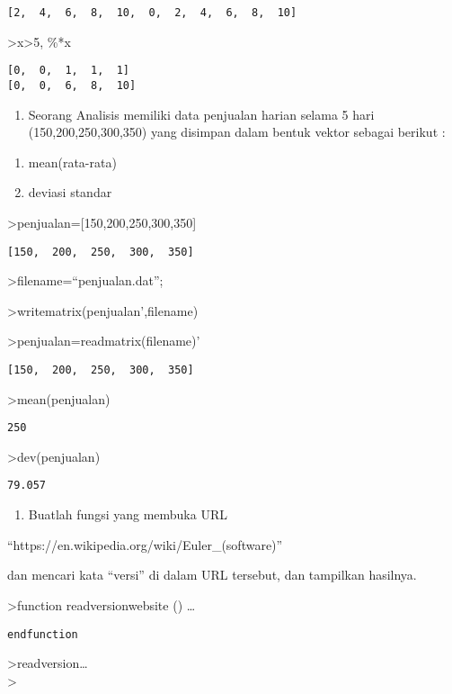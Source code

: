 \documentclass[
]{book}
\providecommand{\tightlist}{%
  \setlength{\itemsep}{0pt}\setlength{\parskip}{0pt}}
\begin{document}
\begin{verbatim}
[2,  4,  6,  8,  10,  0,  2,  4,  6,  8,  10]
\end{verbatim}

\textgreater x\textgreater5, \%*x

\begin{verbatim}
[0,  0,  1,  1,  1]
[0,  0,  6,  8,  10]
\end{verbatim}

\begin{enumerate}
\def\labelenumi{\arabic{enumi}.}
\setcounter{enumi}{1}
\tightlist
\item
  Seorang Analisis memiliki data penjualan harian selama 5 hari (150,200,250,300,350) yang disimpan dalam bentuk vektor sebagai berikut :
\end{enumerate}

\begin{enumerate}
\def\labelenumi{\alph{enumi}.}
\item
  mean(rata-rata)
\item
  deviasi standar
\end{enumerate}

\textgreater penjualan={[}150,200,250,300,350{]}

\begin{verbatim}
[150,  200,  250,  300,  350]
\end{verbatim}

\textgreater filename=``penjualan.dat'';

\textgreater writematrix(penjualan',filename)

\textgreater penjualan=readmatrix(filename)'

\begin{verbatim}
[150,  200,  250,  300,  350]
\end{verbatim}

\textgreater mean(penjualan)

\begin{verbatim}
250
\end{verbatim}

\textgreater dev(penjualan)

\begin{verbatim}
79.057
\end{verbatim}

\begin{enumerate}
\def\labelenumi{\arabic{enumi}.}
\setcounter{enumi}{2}
\tightlist
\item
  Buatlah fungsi yang membuka URL
\end{enumerate}

``https://en.wikipedia.org/wiki/Euler\_(software)''

dan mencari kata ``versi'' di dalam URL tersebut, dan tampilkan hasilnya.

\textgreater function readversionwebsite () \ldots{}

\begin{verbatim}
endfunction
\end{verbatim}

\textgreater readversion\ldots{}\\
\textgreater{}

\backmatter
\end{document}
